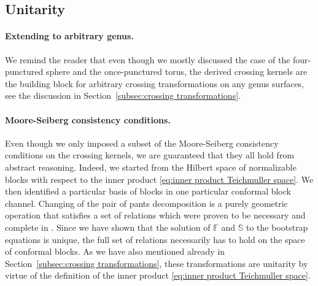 \documentclass[12pt,a4paper]{article}
\begin{document}
\subsection{Unitarity} \label{subsec:unitarity}

\paragraph{Extending to arbitrary genus.} We remind the reader that even though we mostly discussed the case of the four-punctured sphere and the once-punctured torus, the derived crossing kernels are the building block for arbitrary crossing transformations on any genus surfaces, see the discussion in Section~\ref{subsec:crossing transformations}.

\paragraph{Moore-Seiberg consistency conditions.} Even though we only imposed a subset of the Moore-Seiberg consistency conditions on the crossing kernels, we are guaranteed that they all hold from abstract reasoning. Indeed, we started from the Hilbert space of normalizable blocks with respect to the inner product \eqref{eq:inner product Teichmuller space}. We then identified a particular basis of blocks in one particular conformal block channel. Changing of the pair of pants decomposition is a purely geometric operation that satisfies a set of relations which were proven to be necessary and complete in \cite{Bakalov:2000}. 
Since we have shown that the solution of $\mathbb{F}$ and $\mathbb{S}$ to the bootstrap equations is unique, the full set of relations necessarily has to hold on the space of conformal blocks. As we have also mentioned already in Section~\ref{subsec:crossing transformations}, these transformations are unitarity by virtue of the definition of the inner product \eqref{eq:inner product Teichmuller space}.
\end{document}
